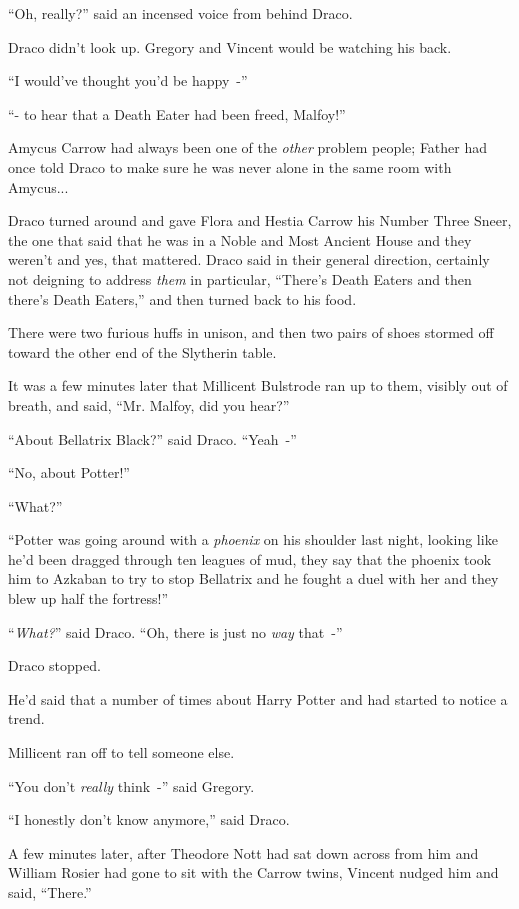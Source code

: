 ``Oh, really?'' said an incensed voice from behind Draco.

Draco didn't look up. Gregory and Vincent would be watching his back.

``I would've thought you'd be happy~-''

``- to hear that a Death Eater had been freed, Malfoy!''

Amycus Carrow had always been one of the \emph{other} problem people; Father had once told Draco to make sure he was never alone in the same room with Amycus...

Draco turned around and gave Flora and Hestia Carrow his Number Three Sneer, the one that said that he was in a Noble and Most Ancient House and they weren't and yes, that mattered. Draco said in their general direction, certainly not deigning to address \emph{them} in particular, ``There's Death Eaters and then there's Death Eaters,'' and then turned back to his food.

There were two furious huffs in unison, and then two pairs of shoes stormed off toward the other end of the Slytherin table.

It was a few minutes later that Millicent Bulstrode ran up to them, visibly out of breath, and said, ``Mr. Malfoy, did you hear?''

``About Bellatrix Black?'' said Draco. ``Yeah~-''

``No, about Potter!''

``What?''

``Potter was going around with a \emph{phoenix} on his shoulder last night, looking like he'd been dragged through ten leagues of mud, they say that the phoenix took him to Azkaban to try to stop Bellatrix and he fought a duel with her and they blew up half the fortress!''

``\emph{What?}'' said Draco. ``Oh, there is just no \emph{way} that~-''

Draco stopped.

He'd said that a number of times about Harry Potter and had started to notice a trend.

Millicent ran off to tell someone else.

``You don't \emph{really} think~-'' said Gregory.

``I honestly don't know anymore,'' said Draco.

A few minutes later, after Theodore Nott had sat down across from him and William Rosier had gone to sit with the Carrow twins, Vincent nudged him and said, ``There.''

